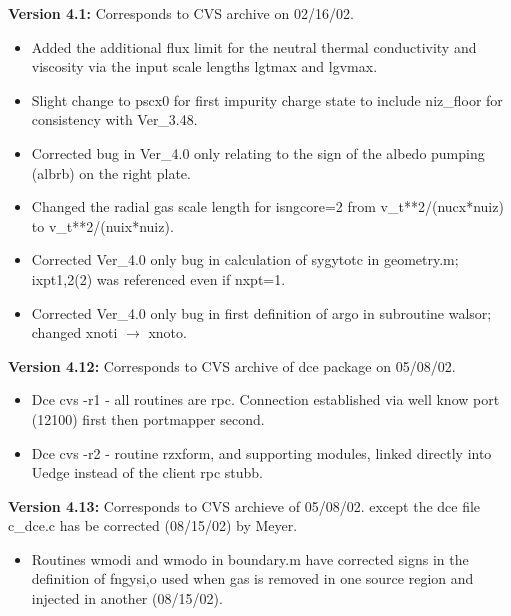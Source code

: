 \documentclass [12pt]{article}
\def\hsa{\hskip.4truein}
\begin{document}
{
}

\noindent\textbf{Version 4.1:}  Corresponds to CVS archive on 02/16/02.  
\begin{itemize}
  \item Added the additional flux limit for the neutral thermal
        conductivity and viscosity via the input scale lengths 
        lgtmax and lgvmax.
  \item Slight change to pscx0 for first impurity charge state to
                  include niz\_floor for consistency with Ver\_3.48.
  \item Corrected bug in Ver\_4.0 only relating to the sign of
                  the albedo pumping (albrb) on the right plate.
  \item Changed the radial gas scale length for isngcore=2 from
                  v\_t**2/(nucx*nuiz) to v\_t**2/(nuix*nuiz).
  \item Corrected Ver\_4.0 only bug in calculation of sygytotc in 
                  geometry.m; ixpt1,2(2) was referenced even if nxpt=1.
  \item Corrected Ver\_4.0 only bug in first definition of argo in
                  subroutine walsor; changed xnoti $\rightarrow$ xnoto.
\end{itemize}

\noindent\textbf{Version 4.12:} Corresponds to CVS archive of dce package 
on 05/08/02.
\begin{itemize}
 \item Dce cvs -r1 - all routines are rpc. Connection established via well 
                  know port (12100) first then portmapper second.
 \item Dce cvs -r2 - routine rzxform, and supporting modules, linked
                  directly into Uedge instead of the client rpc stubb. 
\end{itemize}

\noindent\textbf{Version 4.13:} Corresponds to CVS archieve of 05/08/02.
except the dce file c\_dce.c has be corrected (08/15/02) by Meyer.
\begin{itemize}
  \item Routines wmodi and wmodo in boundary.m have corrected signs in the
        definition of fngysi,o used when gas is removed in one source region 
        and injected in another (08/15/02).
\end{itemize}
\end{document}
